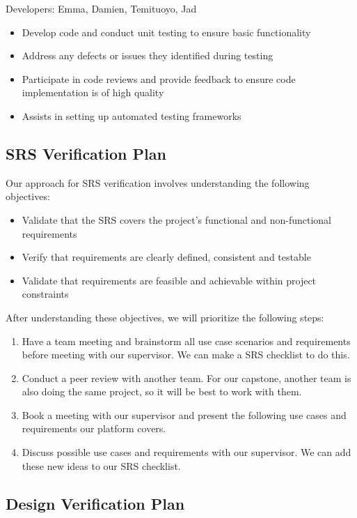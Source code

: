 \documentclass[12pt, titlepage]{article}
\begin{document}
\noindent Developers: Emma, Damien, Temituoyo, Jad
\begin{itemize}
    \item Develop code and conduct unit testing to ensure basic functionality
    \item Address any defects or issues they identified during testing
    \item Participate in code reviews and provide feedback to ensure code implementation is of high quality
    \item Assists in setting up automated testing frameworks
\end{itemize}

\subsection{SRS Verification Plan}

\noindent Our approach for SRS verification involves understanding the following objectives:

\begin{itemize}
    \item Validate that the SRS covers the project’s functional and non-functional requirements
    \item Verify that requirements are clearly defined, consistent and testable
    \item Validate that requirements are feasible and achievable within project constraints
\end{itemize}

After understanding these objectives, we will prioritize the following steps:
\begin{enumerate}
    \item Have a team meeting and brainstorm all use case scenarios and requirements before meeting with our supervisor. We can make a SRS checklist to do this.
    \item Conduct a peer review with another team. For our capstone, another team is also doing the same project, so it will be best to work with them.
    \item Book a meeting with our supervisor and present the following use cases and requirements our platform covers.
    \item Discuss possible use cases and requirements with our supervisor. We can add these new ideas to our SRS checklist.
    
\end{enumerate}

\subsection{Design Verification Plan}
\end{document}
